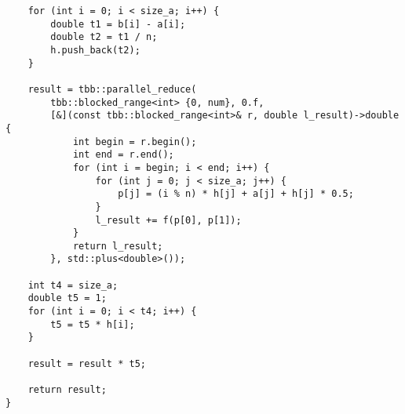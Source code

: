 \documentclass{report}
\begin{document}
\begin{lstlisting}
    for (int i = 0; i < size_a; i++) {
        double t1 = b[i] - a[i];
        double t2 = t1 / n;
        h.push_back(t2);
    }

    result = tbb::parallel_reduce(
        tbb::blocked_range<int> {0, num}, 0.f,
        [&](const tbb::blocked_range<int>& r, double l_result)->double {
            int begin = r.begin();
            int end = r.end();
            for (int i = begin; i < end; i++) {
                for (int j = 0; j < size_a; j++) {
                    p[j] = (i % n) * h[j] + a[j] + h[j] * 0.5;
                }
                l_result += f(p[0], p[1]);
            }
            return l_result;
        }, std::plus<double>());

    int t4 = size_a;
    double t5 = 1;
    for (int i = 0; i < t4; i++) {
        t5 = t5 * h[i];
    }

    result = result * t5;

    return result;
}
\end{lstlisting}
\end{document}
